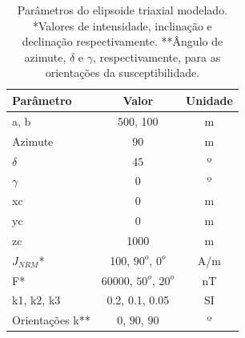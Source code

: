 \begin{table}[h!]
	\begin{center}
		\begin{tabular}{|l|c|c|}
			\hline
			\textbf{Parâmetro}  & \textbf{Valor}  & \textbf{Unidade}\\
			\hline 
			a, b  & 500, 100 & m\\
			\hline
			Azimute   & $90$ & m\\
			\hline
			$\delta$    & $45$ & º\\
			\hline
			$\gamma$   & $0$  & º\\
			\hline
			xc   & 0  & m\\
			\hline          
			yc   & 0  & m\\
			\hline                
			zc   & 1000  & m\\
			\hline
			$J_{NRM}$*  & 100, $90^o$, $0^o$  & A/m\\
			\hline
			F*    & 60000, $50^o$, $20^o$ & nT\\
			\hline
			k1, k2, k3   & 0.2, 0.1, 0.05  & SI\\
			\hline
			Orientações k**   & $0$, $90$, $90$  & º\\
			\hline
		\end{tabular}
		\caption{Parâmetros do elipsoide triaxial modelado. *Valores de intensidade, inclinação e declinação respectivamente. **Ângulo de azimute, $\delta$ e $\gamma$, respectivamente, para as orientações da susceptibilidade.}
	\end{center}
	\label{tab:triaxial_prolate2}
\end{table}

